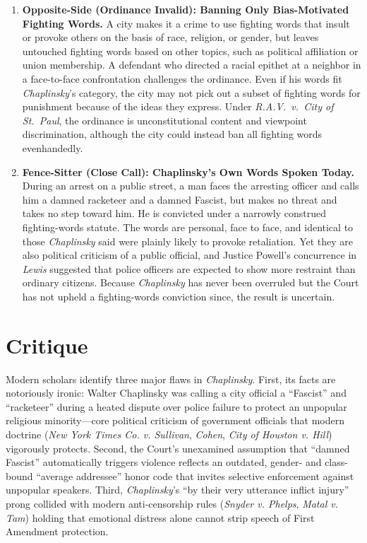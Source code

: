 \documentclass[12pt]{article}
\begin{document}
\begin{enumerate}
\item \textbf{Opposite-Side (Ordinance Invalid): Banning Only Bias-Motivated Fighting Words.} A city makes it a crime to use fighting words that insult or provoke others on the basis of race, religion, or gender, but leaves untouched fighting words based on other topics, such as political affiliation or union membership. A defendant who directed a racial epithet at a neighbor in a face-to-face confrontation challenges the ordinance. Even if his words fit \textit{Chaplinsky}'s category, the city may not pick out a subset of fighting words for punishment because of the ideas they express. Under \textit{R.A.V.\ v.\ City of St.\ Paul}, the ordinance is unconstitutional content and viewpoint discrimination, although the city could instead ban all fighting words evenhandedly.

\item \textbf{Fence-Sitter (Close Call): Chaplinsky's Own Words Spoken Today.} During an arrest on a public street, a man faces the arresting officer and calls him a damned racketeer and a damned Fascist, but makes no threat and takes no step toward him. He is convicted under a narrowly construed fighting-words statute. The words are personal, face to face, and identical to those \textit{Chaplinsky} said were plainly likely to provoke retaliation. Yet they are also political criticism of a public official, and Justice Powell's concurrence in \textit{Lewis} suggested that police officers are expected to show more restraint than ordinary citizens. Because \textit{Chaplinsky} has never been overruled but the Court has not upheld a fighting-words conviction since, the result is uncertain.

\end{enumerate}

\section{Critique}
Modern scholars identify three major flaws in \textit{Chaplinsky}. First, its facts are notoriously ironic: Walter Chaplinsky was calling a city official a ``Fascist'' and ``racketeer'' during a heated dispute over police failure to protect an unpopular religious minority---core political criticism of government officials that modern doctrine (\textit{New York Times Co. v. Sullivan}, \textit{Cohen}, \textit{City of Houston v. Hill}) vigorously protects. Second, the Court's unexamined assumption that ``damned Fascist'' automatically triggers violence reflects an outdated, gender- and class-bound ``average addressee'' honor code that invites selective enforcement against unpopular speakers. Third, \textit{Chaplinsky}'s ``by their very utterance inflict injury'' prong collided with modern anti-censorship rules (\textit{Snyder v. Phelps}, \textit{Matal v. Tam}) holding that emotional distress alone cannot strip speech of First Amendment protection.
\end{document}
